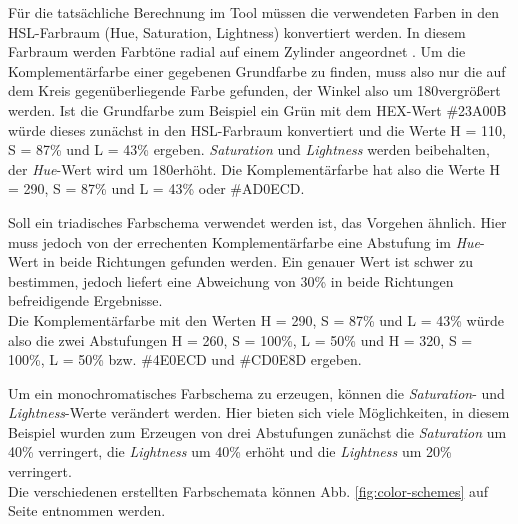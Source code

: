 Für die tatsächliche Berechnung im Tool müssen die verwendeten Farben in den HSL-Farbraum (Hue, Saturation, Lightness) konvertiert werden. In diesem Farbraum werden Farbtöne radial auf einem Zylinder angeordnet \cite{joblove1978color}.
Um die Komplementärfarbe einer gegebenen Grundfarbe zu finden, muss also nur die auf dem Kreis gegenüberliegende Farbe gefunden, der Winkel also um 180\degree vergrößert werden. 
Ist die Grundfarbe zum Beispiel ein Grün mit dem HEX-Wert \#23A00B würde dieses zunächst in den HSL-Farbraum konvertiert und die Werte H = 110\degree, S = 87\% und L = 43\% ergeben. \textit{Saturation} und \textit{Lightness} werden beibehalten, der \textit{Hue}-Wert wird um 180\degree erhöht. Die Komplementärfarbe hat also die Werte  H = 290\degree, S = 87\% und L = 43\% oder \#AD0ECD.

Soll ein triadisches Farbschema verwendet werden ist, das Vorgehen ähnlich. Hier muss jedoch von der errechenten Komplementärfarbe eine Abstufung im \textit{Hue}-Wert in beide Richtungen gefunden werden. Ein genauer Wert ist schwer zu bestimmen, jedoch liefert eine Abweichung von 30\% in beide Richtungen befreidigende Ergebnisse.\\
Die Komplementärfarbe mit den Werten  H = 290\degree, S = 87\% und L = 43\% würde also die zwei Abstufungen H = 260\degree, S = 100\%, L = 50\% und H = 320\degree, S = 100\%, L = 50\% bzw. \#4E0ECD und \#CD0E8D ergeben. 

Um ein monochromatisches Farbschema zu erzeugen, können die \textit{Saturation}- und \textit{Lightness}-Werte verändert werden. Hier bieten sich viele Möglichkeiten, in diesem Beispiel wurden zum Erzeugen von drei Abstufungen zunächst die \textit{Saturation} um 40\% verringert, die \textit{Lightness} um 40\% erhöht und die \textit{Lightness} um 20\% verringert.\\
Die verschiedenen erstellten Farbschemata können Abb. \ref{fig:color-schemes} auf Seite \pageref{fig:color-schemes} entnommen werden. 


